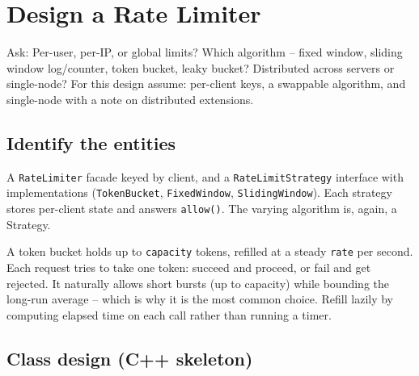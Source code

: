 \section{Design a Rate Limiter}
\label{sec:case-rate-limiter}


\begin{patternbox}
Ask: Per-user, per-IP, or global limits? Which algorithm -- fixed window,
sliding window log/counter, token bucket, leaky bucket? Distributed across
servers or single-node? For this design assume: per-client keys, a
swappable algorithm, and single-node with a note on distributed
extensions.
\end{patternbox}

\subsection*{Identify the entities}

A \texttt{RateLimiter} facade keyed by client, and a
\texttt{RateLimitStrategy} interface with implementations
(\texttt{TokenBucket}, \texttt{FixedWindow}, \texttt{SlidingWindow}). Each
strategy stores per-client state and answers \texttt{allow()}. The varying
algorithm is, again, a Strategy.

\begin{ideabox}
A token bucket holds up to \texttt{capacity} tokens, refilled at a steady
\texttt{rate} per second. Each request tries to take one token: succeed and
proceed, or fail and get rejected. It naturally allows short bursts (up to
capacity) while bounding the long-run average -- which is why it is the
most common choice. Refill lazily by computing elapsed time on each call
rather than running a timer.
\end{ideabox}

\subsection*{Class design (C++ skeleton)}

